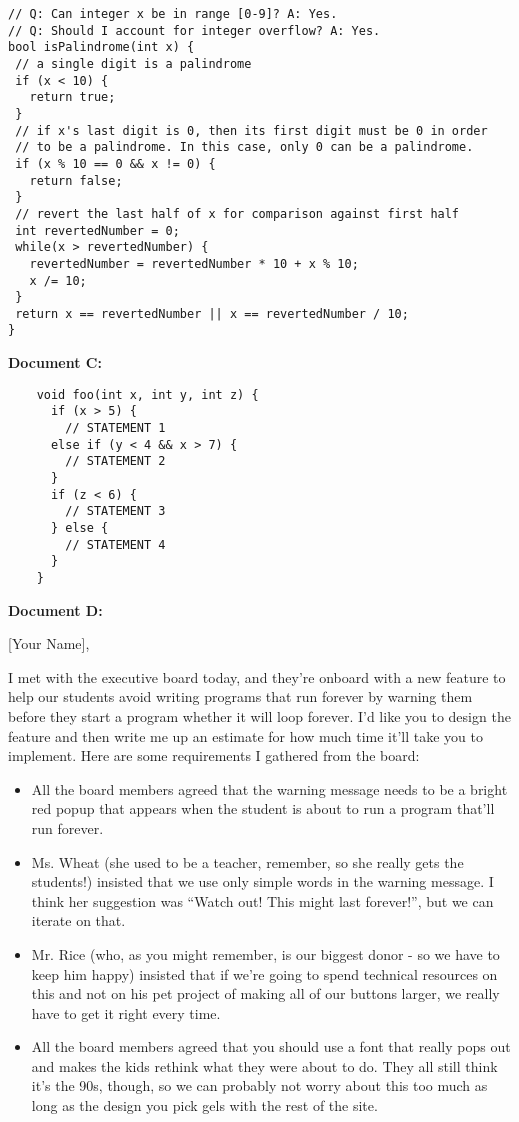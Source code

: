 \documentclass{report}
\begin{document}
\begin{spacing}{1.4}
\begin{enumerate}[leftmargin=*]
    \begin{lstlisting}
// Q: Can integer x be in range [0-9]? A: Yes.
// Q: Should I account for integer overflow? A: Yes.
bool isPalindrome(int x) {
 // a single digit is a palindrome
 if (x < 10) {
   return true;
 }
 // if x's last digit is 0, then its first digit must be 0 in order
 // to be a palindrome. In this case, only 0 can be a palindrome.
 if (x % 10 == 0 && x != 0) {
   return false;
 }
 // revert the last half of x for comparison against first half
 int revertedNumber = 0;
 while(x > revertedNumber) {
   revertedNumber = revertedNumber * 10 + x % 10;
   x /= 10;
 }
 return x == revertedNumber || x == revertedNumber / 10;
}
\end{lstlisting}
    \newpage
    \textbf{Document C:}
    \begin{lstlisting}
    void foo(int x, int y, int z) {
      if (x > 5) {
        // STATEMENT 1
      else if (y < 4 && x > 7) {
        // STATEMENT 2
      }
      if (z < 6) {
        // STATEMENT 3
      } else {
        // STATEMENT 4
      }
    }
    \end{lstlisting}

\vspace{0.5in}
    
    \textbf{Document D:}

    [Your Name],

    I met with the executive board today, and they're onboard with a new feature to help our students avoid
    writing programs that run forever by warning them before they start a program whether it will loop forever.
    I'd like you to design the feature and then write me up an estimate for how much time it'll take you to
    implement. Here are some requirements I gathered from the board:
    \begin{itemize}
    \item All the board members agreed that the warning message needs to be a bright red popup that appears
      when the student is about to run a program that'll run forever.
    \item Ms. Wheat (she used to be a teacher, remember, so she really gets the students!) insisted that we
      use only simple words in the warning message. I think her suggestion was ``Watch out! This might last forever!'', but
      we can iterate on that.
    \item Mr. Rice (who, as you might remember, is our biggest donor - so we have to keep him happy) insisted that
      if we're going to spend technical resources on this and not on his pet project of making all of our buttons larger,
      we really have to get it right every time.
    \item All the board members agreed that you should use a font that really pops out and makes the kids rethink what
      they were about to do. They all still think it's the 90s, though, so we can probably not worry about this too much
      as long as the design you pick gels with the rest of the site.
    \end{itemize}


\end{enumerate}
\end{spacing}
\end{document}
